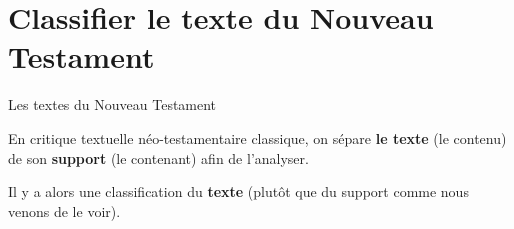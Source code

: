 \documentclass[11pt]{beamer}
\begin{document}




\section{Classifier le texte du Nouveau Testament}

\begin{frame}{Les textes du Nouveau Testament}

    \begin{alertblock}{}
En critique textuelle néo-testamentaire classique, on sépare \textbf{le texte} (le contenu) de son \textbf{support} (le contenant) afin de l'analyser. 
    \end{alertblock}

    Il y a alors une classification du \textbf{texte} (plutôt que du support comme nous venons de le voir).
\end{frame}
\end{document}

